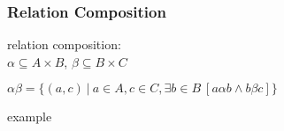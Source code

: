 \documentclass[dvipsnames]{beamer}
\begin{document}
\begin{frame}
  \frametitle{Relation Composition}

  \begin{definition}
    \alert{relation composition}:\\
      $\alpha \subseteq A \times B$, $\beta \subseteq B \times C$

      $\alpha \beta = \{(a,c)~|~a \in A, c \in C,
                \exists b \in B~[a \alpha b \wedge b \beta c]\}$
  \end{definition}

  \medskip
  \begin{exampleblock}{example}
    \begin{columns}
      \begin{center}
      \end{center}

      \begin{center}
      \end{center}
    \end{columns}
  \end{exampleblock}
\end{frame}
\end{document}
